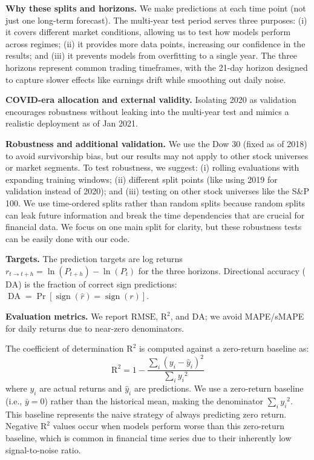 \documentclass[conference,a4paper]{IEEEtran}
\newcommand{\rmse}{\ensuremath{\mathrm{RMSE}}}
\newcommand{\rTwo}{\ensuremath{\mathrm{R}^2}}
\newcommand{\da}{\ensuremath{\mathrm{DA}}}
\begin{document}
	\textbf{Why these splits and horizons.} We make predictions at each time point (not just one long-term forecast). The multi-year test period serves three purposes: (i) it covers different market conditions, allowing us to test how models perform across regimes; (ii) it provides more data points, increasing our confidence in the results; and (iii) it prevents models from overfitting to a single year. The three horizons represent common trading timeframes, with the 21-day horizon designed to capture slower effects like earnings drift while smoothing out daily noise.

	\textbf{COVID-era allocation and external validity.} Isolating 2020 as validation encourages robustness without leaking into the multi-year test and mimics a realistic deployment as of Jan 2021.

\textbf{Robustness and additional validation.} We use the Dow 30 (fixed as of 2018) to avoid survivorship bias, but our results may not apply to other stock universes or market segments. To test robustness, we suggest: (i) rolling evaluations with expanding training windows; (ii) different split points (like using 2019 for validation instead of 2020); and (iii) testing on other stock universes like the S\&P 100. We use time-ordered splits rather than random splits because random splits can leak future information and break the time dependencies that are crucial for financial data. We focus on one main split for clarity, but these robustness tests can be easily done with our code.

    	\textbf{Targets.} The prediction targets are log returns $r_{t\to t+h} = \ln(P_{t+h}) - \ln(P_t)$ for the three horizons. Directional accuracy (\da{}) is the fraction of correct sign predictions: $\operatorname{DA} = \Pr[\operatorname{sign}(\hat{r}) = \operatorname{sign}(r)]$.

    	\textbf{Evaluation metrics.} We report \rmse{}, \rTwo{}, and \da{}; we avoid MAPE/sMAPE for daily returns due to near-zero denominators. 
    	
    	The coefficient of determination $\rTwo$ is computed against a zero-return baseline as:
    	\begin{equation}
    	\rTwo = 1 - \frac{\sum_i {(y_i - \hat{y}_i)}^2}{\sum_i {y_i}^2}
    	\end{equation}
    	where $y_i$ are actual returns and $\hat{y}_i$ are predictions. We use a zero-return baseline (i.e., $\bar{y} = 0$) rather than the historical mean, making the denominator $\sum_i {y_i}^2$. This baseline represents the naive strategy of always predicting zero return. Negative $\rTwo$ values occur when models perform worse than this zero-return baseline, which is common in financial time series due to their inherently low signal-to-noise ratio.
    	
\end{document}
